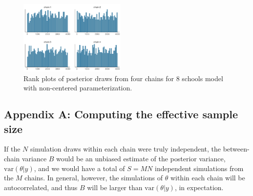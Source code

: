 \documentclass[american,]{article}
\begin{document}
\begin{figure}[tp]
  \centering
  \includegraphics[width=0.47\textwidth]{graphics/hist-fit-ncp2-1.pdf}
  \caption{Rank plots of posterior draws from four chains for 8 schools model with non-centered parameterization.}
  \label{fig:hist-fit-ncp2-1}
\end{figure}




%
%





\hypertarget{refs}{}



\newpage
\hypertarget{ESS}{%
\subsection*{Appendix A: Computing the effective sample size}\label{ESS}}

If the \(N\) simulation draws within each chain were truly independent,
the between-chain variance \(B\) would be an unbiased estimate of the
posterior variance, \(\mbox{var}(\theta | y)\), and we would have a
total of \(S = MN\) independent simulations from the \(M\) chains. In
general, however, the simulations of \(\theta\) within each chain will
be autocorrelated, and thus \(B\) will be larger than
\(\mbox{var}(\theta | y)\), in expectation.
\end{document}
